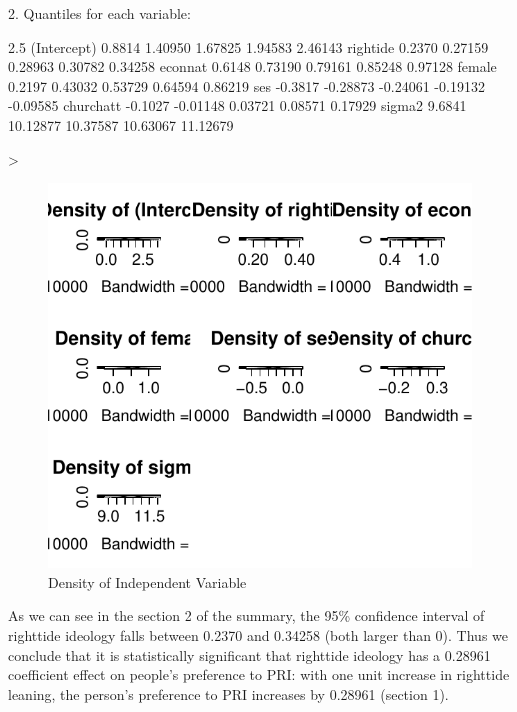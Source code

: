 \documentclass[12pt]{article}
\begin{document}
\begin{enumerate}
\begin{Schunk}
\begin{Soutput}
2. Quantiles for each variable:

               2.5%
(Intercept)  0.8814  1.40950  1.67825  1.94583  2.46143
rightide     0.2370  0.27159  0.28963  0.30782  0.34258
econnat      0.6148  0.73190  0.79161  0.85248  0.97128
female       0.2197  0.43032  0.53729  0.64594  0.86219
ses         -0.3817 -0.28873 -0.24061 -0.19132 -0.09585
churchatt   -0.1027 -0.01148  0.03721  0.08571  0.17929
sigma2       9.6841 10.12877 10.37587 10.63067 11.12679
\end{Soutput}
\begin{Sinput}
> 
\end{Sinput}
\end{Schunk}


\begin{figure}[htbp]
  \begin{center}
    \includegraphics[width=\textwidth]{PS3-Figure1.pdf}
  \end{center}
  \caption{Density of Independent Variable}
  \label{f:f1}
\end{figure}

As we can see in the section 2 of the summary, the 95\% confidence interval of righttide ideology falls between 0.2370 and 0.34258 (both larger than 0). Thus we conclude that it is statistically significant that righttide ideology has a 0.28961 coefficient effect on people's preference to PRI: with one unit increase in righttide leaning, the person's preference to PRI increases by 0.28961 (section 1).




\end{enumerate}
\end{document}
